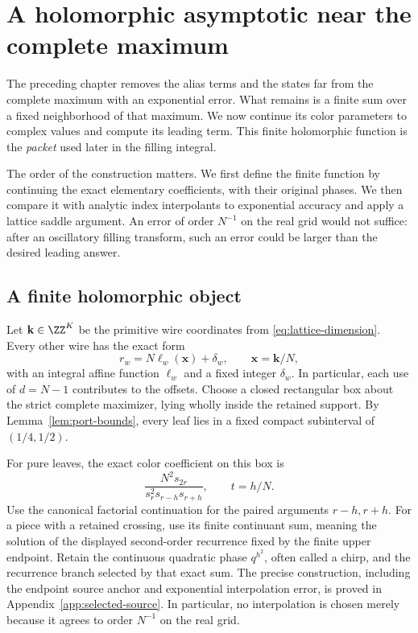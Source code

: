 \chapter{A holomorphic asymptotic near the complete maximum}\label{ch:packet}

The preceding chapter removes the alias terms and the states far from the complete maximum with an exponential error. What remains is a finite sum over a fixed neighborhood of that maximum. We now continue its color parameters to complex values and compute its leading term. This finite holomorphic function is the \emph{packet} used later in the filling integral.

The order of the construction matters. We first define the finite function by continuing the exact elementary coefficients, with their original phases. We then compare it with analytic index interpolants to exponential accuracy and apply a lattice saddle argument. An error of order $N^{-1}$ on the real grid would not suffice: after an oscillatory filling transform, such an error could be larger than the desired leading answer.

\section{A finite holomorphic object}
Let $\mathbf k\in\ZZ^K$ be the primitive wire coordinates from \eqref{eq:lattice-dimension}. Every other wire has the exact form
\begin{equation}\label{eq:affine-offsets}
 r_w=N\ell_w(\mathbf x)+\delta_w,\qquad \mathbf x=\mathbf k/N,
\end{equation}
with an integral affine function $\ell_w$ and a fixed integer $\delta_w$. In particular, each use of $d=N-1$ contributes to the offsets. Choose a closed rectangular box about the strict complete maximizer, lying wholly inside the retained support. By Lemma~\ref{lem:port-bounds}, every leaf lies in a fixed compact subinterval of $(1/4,1/2)$.

For pure leaves, the exact color coefficient on this box is
\[
 \frac{N^2s_{2r}}{s_r^2s_{r-h}s_{r+h}},\qquad t=h/N.
\]
Use the canonical factorial continuation for the paired arguments $r-h,r+h$. For a piece with a retained crossing, use its finite continuant sum, meaning the solution of the displayed second-order recurrence fixed by the finite upper endpoint. Retain the continuous quadratic phase $q^{h^2}$, often called a chirp, and the recurrence branch selected by that exact sum. The precise construction, including the endpoint source anchor and exponential interpolation error, is proved in Appendix~\ref{app:selected-source}. In particular, no interpolation is chosen merely because it agrees to order $N^{-1}$ on the real grid.

